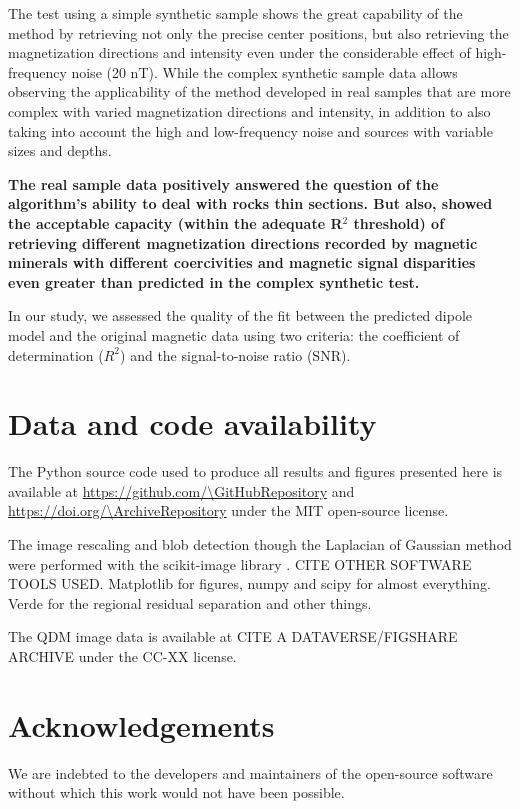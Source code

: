 The test using a simple synthetic sample shows the great capability of the method by retrieving not only the precise center positions, but also retrieving the magnetization directions and intensity even under the considerable effect of high-frequency noise (20 nT). While the complex synthetic sample data allows observing the applicability of the method developed in real samples that are more complex with varied magnetization directions and intensity, in addition to also taking into account the high and low-frequency noise and sources with variable sizes and depths.

\textbf{The real sample data positively answered the question of the algorithm's
ability to deal with rocks thin sections. But also, showed the acceptable
capacity (within the adequate R$^2$ threshold) of retrieving different
magnetization directions recorded by magnetic minerals with different
coercivities and magnetic signal disparities even greater than predicted in the
complex synthetic test.}

In our study, we assessed the quality of the fit between the predicted dipole model and the original magnetic data using two criteria: the coefficient of determination ($R^2$) and the signal-to-noise ratio (SNR).


\section{Data and code availability}

The Python source code used to produce all results and figures presented here
is available at \url{https://github.com/\GitHubRepository} and
\url{https://doi.org/\ArchiveRepository} under the MIT open-source license.

The image rescaling and blob detection though the Laplacian of Gaussian method
were performed with the scikit-image library \citep{VanderWalt2014}. CITE OTHER
SOFTWARE TOOLS USED. Matplotlib for figures, numpy and scipy for almost
everything. Verde for the regional residual separation and other things.

The QDM image data is available at CITE A DATAVERSE/FIGSHARE ARCHIVE under the
CC-XX license.


\section{Acknowledgements}

We are indebted to the developers and maintainers of the open-source software
without which this work would not have been possible.

